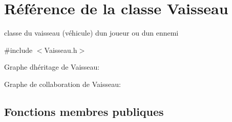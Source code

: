 \hypertarget{class_vaisseau}{}\section{Référence de la classe Vaisseau}
\label{class_vaisseau}


classe du vaisseau (véhicule) d\textquotesingle{}un joueur ou d\textquotesingle{}un ennemi  




{\ttfamily \#include $<$Vaisseau.\+h$>$}



Graphe d\textquotesingle{}héritage de Vaisseau\+:


Graphe de collaboration de Vaisseau\+:
\subsection*{Fonctions membres publiques}
